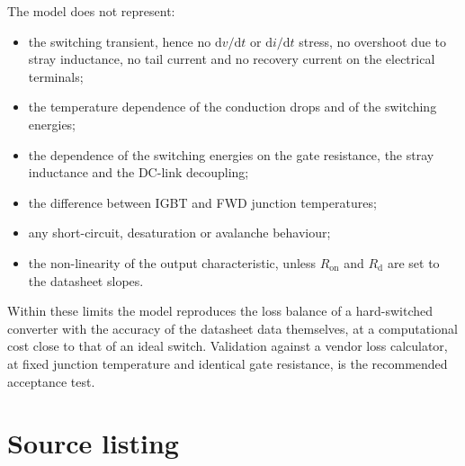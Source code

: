 \documentclass[11pt,a4paper]{article}
\begin{document}
The model does not represent:
\begin{itemize}
  \item the switching transient, hence no $\mathrm{d}v/\mathrm{d}t$ or
        $\mathrm{d}i/\mathrm{d}t$ stress, no overshoot due to stray inductance,
        no tail current and no recovery current on the electrical terminals;
  \item the temperature dependence of the conduction drops and of the switching
        energies;
  \item the dependence of the switching energies on the gate resistance, the
        stray inductance and the DC-link decoupling;
  \item the difference between IGBT and FWD junction temperatures;
  \item any short-circuit, desaturation or avalanche behaviour;
  \item the non-linearity of the output characteristic, unless $R_\mathrm{on}$
        and $R_\mathrm{d}$ are set to the datasheet slopes.
\end{itemize}

Within these limits the model reproduces the loss balance of a hard-switched
converter with the accuracy of the datasheet data themselves, at a computational
cost close to that of an ideal switch. Validation against a vendor loss
calculator, at fixed junction temperature and identical gate resistance, is the
recommended acceptance test.

\appendix
\section{Source listing}


\end{document}
